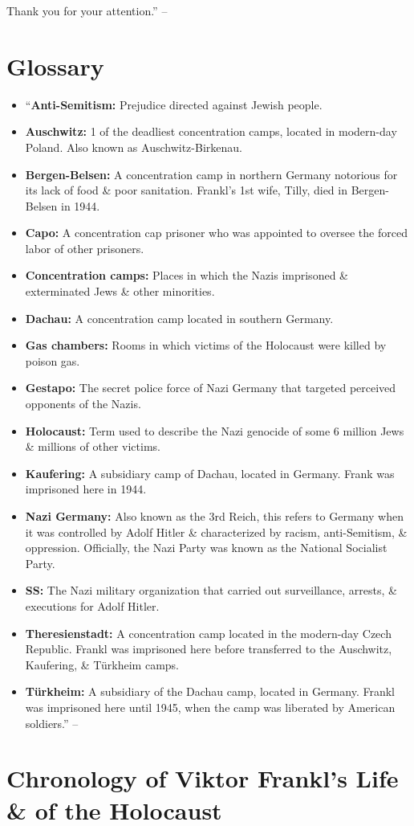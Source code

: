 \documentclass{article}
\numberwithin{equation}{section}
\begin{document}
Thank you for your attention.'' -- \cite[pp. 124--126]{Frankl2017}


\section{Glossary}

\begin{itemize}
	\item ``\textbf{Anti-Semitism:} Prejudice directed against Jewish people.
	\item \textbf{Auschwitz:} 1 of the deadliest concentration camps, located in modern-day Poland. Also known as Auschwitz-Birkenau.
	\item \textbf{Bergen-Belsen:} A concentration camp in northern Germany notorious for its lack of food \& poor sanitation. Frankl's 1st wife, Tilly, died in Bergen-Belsen in 1944.
	\item \textbf{Capo:} A concentration cap prisoner who was appointed to oversee the forced labor of other prisoners.
	\item \textbf{Concentration camps:} Places in which the Nazis imprisoned \& exterminated Jews \& other minorities.
	\item \textbf{Dachau:} A concentration camp located in southern Germany.
	\item \textbf{Gas chambers:} Rooms in which victims of the Holocaust were killed by poison gas.
	\item \textbf{Gestapo:} The secret police force of Nazi Germany that targeted perceived opponents of the Nazis.
	\item \textbf{Holocaust:} Term used to describe the Nazi genocide of some 6 million Jews \& millions of other victims.
	\item \textbf{Kaufering:} A subsidiary camp of Dachau, located in Germany. Frank was imprisoned here in 1944.
	\item \textbf{Nazi Germany:} Also known as the 3rd Reich, this refers to Germany when it was controlled by Adolf Hitler \& characterized by racism, anti-Semitism, \& oppression. Officially, the Nazi Party was known as the National Socialist Party.
	\item \textbf{SS:} The Nazi military organization that carried out surveillance, arrests, \& executions for Adolf Hitler.
	\item \textbf{Theresienstadt:} A concentration camp located in the modern-day Czech Republic. Frankl was imprisoned here before transferred to the Auschwitz, Kaufering, \& T\"urkheim camps.
	\item \textbf{T\"urkheim:} A subsidiary of the Dachau camp, located in Germany. Frankl was imprisoned here until 1945, when the camp was liberated by American soldiers.'' -- \cite[p. 127]{Frankl2017}
\end{itemize}


\section{Chronology of Viktor Frankl's Life \& of the Holocaust}


\printbibliography[heading=bibintoc]
	
\end{document}
